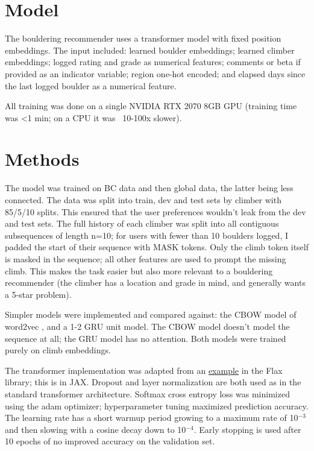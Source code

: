 \documentclass[10pt]{article}
\begin{document}
\section{Model}

The bouldering recommender uses a transformer model with fixed position embeddings. The input included: learned boulder embeddings; learned climber embeddings; logged rating and grade as numerical features; comments or beta if provided as an indicator variable; region one-hot encoded; and elapsed days since the last logged boulder as a numerical feature. 

All training was done on a single NVIDIA RTX 2070 8GB GPU (training time was <1 min; on a CPU it was ~10-100x slower). 


\section{Methods}

The model was trained on BC data and then global data, the latter being less connected. 
The data was split into train, dev and test sets by climber with 85/5/10 splits. This ensured that the user preferences wouldn't leak from the dev and test sets. The full history of each climber was split into all contiguous subsequences of length n=10; for users with fewer than 10 boulders logged, I padded the start of their sequence with MASK tokens. Only the climb token itself is masked in the sequence; all other features are used to prompt the missing climb. This makes the task easier but also more relevant to a bouldering recommender (the climber has a location and grade in mind, and generally wants a 5-star problem).

Simpler models were implemented and compared against: the CBOW model of word2vec \cite{word2vec}, and a 1-2 GRU unit model. The CBOW model doesn't model the sequence at all; the GRU model has no attention. Both models were trained purely on climb embeddings. 

The transformer implementation was adapted from an \href{https://github.com/google/flax/blob/main/examples/nlp_seq/models.py}{example} in the Flax library; this is in JAX. Dropout and layer normalization are both used as in the standard transformer architecture. Softmax cross entropy loss was minimized using the adam optimizer; hyperparameter tuning maximized prediction accuracy. The learning rate has a short warmup period growing to a maximum rate of 10$^{-3}$ and then slowing with a cosine decay down to 10$^{-4}$. Early stopping is used after 10 epochs of no improved accuracy on the validation set.
\end{document}

